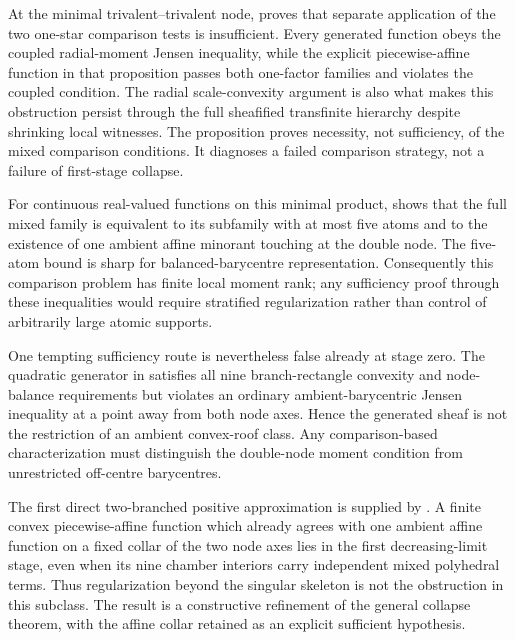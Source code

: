\begin{remark}
At the minimal trivalent--trivalent node,
 proves that separate
application of the two one-star comparison tests is insufficient.  Every
generated function obeys the coupled radial-moment Jensen inequality, while
the explicit piecewise-affine function in that proposition passes both
one-factor families and violates the coupled condition.  The radial
scale-convexity argument is also what makes this obstruction persist through
the full sheafified transfinite hierarchy despite shrinking local witnesses.
The proposition proves necessity, not sufficiency, of the mixed comparison
conditions.  It diagnoses a failed comparison strategy, not a failure of
first-stage collapse.

For continuous real-valued functions on this minimal product,
 shows that the full
mixed family is equivalent to its subfamily with at most five atoms and to
the existence of one ambient affine minorant touching at the double node.
The five-atom bound is sharp for balanced-barycentre representation.
Consequently this comparison problem has finite local moment rank; any
sufficiency proof through these inequalities would require stratified
regularization rather than control of arbitrarily large atomic supports.

One tempting sufficiency route is nevertheless false already at stage zero.
The quadratic generator in
 satisfies all nine
branch-rectangle convexity and node-balance requirements but violates an
ordinary ambient-barycentric Jensen inequality at a point away from both
node axes.  Hence the generated sheaf is not the restriction of an ambient
convex-roof class.  Any comparison-based characterization must distinguish
the double-node moment condition from unrestricted off-centre barycentres.

The first direct two-branched positive approximation is supplied by
.  A finite convex
piecewise-affine function which already agrees with one ambient affine
function on a fixed collar of the two node axes lies in the first
decreasing-limit stage, even when its nine chamber interiors carry
independent mixed polyhedral terms.  Thus regularization beyond the
singular skeleton is not the obstruction in this subclass.  The result is a
constructive refinement of the general collapse theorem, with the affine
collar retained as an explicit sufficient hypothesis.


\end{remark}
